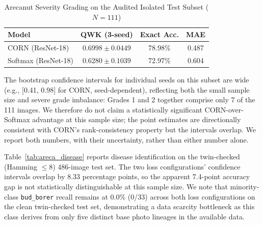 \documentclass[conference]{IEEEtran}
\begin{document}
\begin{table}[htbp]
\caption{Arecanut Severity Grading on the Audited Isolated Test Subset ($N=111$)}
\centering\footnotesize
\begin{tabular}{lccc}
\toprule
\textbf{Model} & \textbf{QWK (3-seed)} & \textbf{Exact Acc.} & \textbf{MAE} \\
\midrule
CORN (ResNet-18) & $0.6998 \pm 0.0449$ & 78.98\% & 0.487 \\
Softmax (ResNet-18) & $0.6280 \pm 0.1039$ & 72.97\% & 0.604 \\
\bottomrule
\end{tabular}
\label{tab:areca_severity}
\end{table}

The bootstrap confidence intervals for individual seeds on this subset are wide (e.g., [0.41, 0.98] for CORN, seed-dependent), reflecting both the small sample size and severe grade imbalance: Grades 1 and 2 together comprise only 7 of the 111 images. We therefore do not claim a statistically significant CORN-over-Softmax advantage at this sample size; the point estimates are directionally consistent with CORN's rank-consistency property but the intervals overlap. We report both numbers, with their uncertainty, rather than either number alone.

\begin{table}[htbp]
\caption{Arecanut Disease Identification (Twin-Checked Test Set, $N=486$)}
\centering\footnotesize
{}
\label{tab:areca_disease}
\end{table}

Table~\ref{tab:areca_disease} reports disease identification on the twin-checked (Hamming $\le 8$) 486-image test set. The two loss configurations' confidence intervals overlap by 8.33 percentage points, so the apparent 7.4-point accuracy gap is not statistically distinguishable at this sample size. We note that minority-class \texttt{bud\_borer} recall remains at 0.0\% (0/33) across both loss configurations on the clean twin-checked test set, demonstrating a data scarcity bottleneck as this class derives from only five distinct base photo lineages in the available data.
\end{document}
